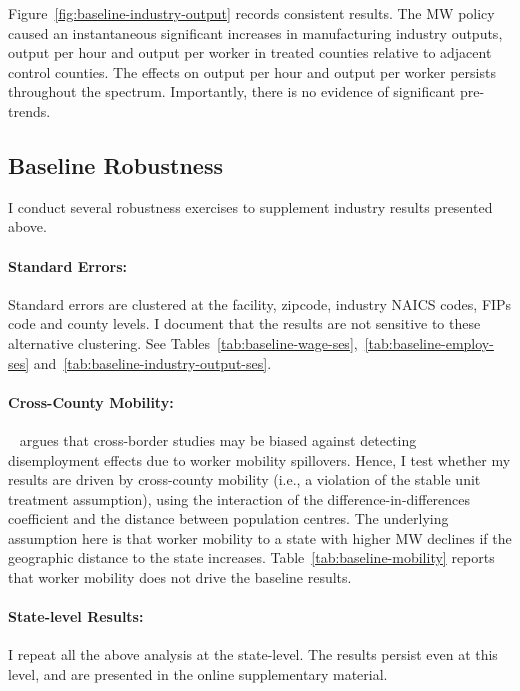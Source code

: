 \documentclass[12pt, english]{article}
\begin{document}
    Figure~\ref{fig:baseline-industry-output} records consistent results. The MW policy caused an instantaneous significant increases in manufacturing industry outputs, output per hour and output per worker in treated counties relative to adjacent control counties. The effects on output per hour and output per worker persists throughout the spectrum. Importantly, there is no evidence of significant pre-trends.
    

    \subsection{Baseline Robustness}\label{subsec:baseline-robustness}
    I conduct several robustness exercises to supplement industry results presented above.

    \paragraph{Standard Errors:} Standard errors are clustered at the facility, zipcode, industry NAICS codes, FIPs code and county levels. I document that the results are not sensitive to these alternative clustering. See Tables~\ref{tab:baseline-wage-ses},~\ref{tab:baseline-employ-ses} and~\ref{tab:baseline-industry-output-ses}.

    \paragraph{Cross-County Mobility:}~\cite{neumark2019econometrics} argues that cross-border studies may be biased against detecting disemployment effects due to worker mobility spillovers. Hence, I test whether my results are driven by cross-county mobility (i.e., a violation of the stable unit treatment assumption), using the interaction of the difference-in-differences coefficient and the distance between population centres. The underlying assumption here is that worker mobility to a state with higher MW declines if the geographic distance to the state increases. Table~\ref{tab:baseline-mobility} reports that worker mobility does not drive the baseline results.

    \paragraph{State-level Results:} I repeat all the above analysis at the state-level. The results persist even at this level, and are presented in the online supplementary material.
\end{document}
